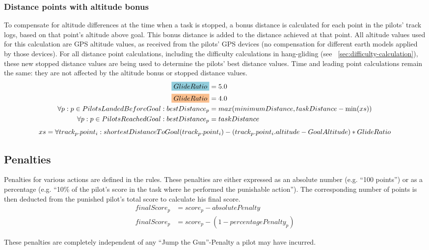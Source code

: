 \documentclass{article}
\begin{document}
\subsubsection{Distance points with altitude bonus}
\label{sec:distance-stopped-tasks}
To compensate for altitude differences at the time when a task is stopped,
a bonus distance is calculated for each point in the pilots’ track logs, based
on that point’s altitude above goal. This bonus distance is added to the
distance achieved at that point. All altitude values used for this calculation
are GPS altitude values, as received from the pilots’ GPS devices (no
compensation for different earth models applied by those devices). For all
distance point calculations, including the difficulty calculations in
hang-gliding (see ~\ref{sec:difficulty-calculation}), these new stopped
distance values are being used to determine the pilots’ best distance values.
Time and leading point calculations remain the same: they are not affected by
the altitude bonus or stopped distance values.
\begin{align*}
    \hgh{GlideRatio} &= 5.0 \\
    \pgh{GlideRatio} &= 4.0 \\
    \forall p : p \in PilotsLandedBeforeGoal : bestDistance_p &= max(minimumDistance, taskDistance - \min(xs)) \\
    \forall p : p \in PilotsReachedGoal : bestDistance_p &= taskDistance
\end{align*}
\[ xs = \forall track_p . point_i : shortestDistanceToGoal(track_p . point_i) - (track_p . point_i . altitude - GoalAltitude) * GlideRatio \\ \]

\subsection{Penalties}
Penalties for various actions are defined in the rules. These penalties are
either expressed as an absolute number (e.g. “100 points”) or as a percentage
(e.g. “10\% of the pilot’s score in the task where he performed the punishable
action”). The corresponding number of points is then deducted from the punished
pilot’s total score to calculate his final score.
\begin{align*}
    finalScore_p &= score_p - absolutePenalty \\
    finalScore_p &= score_p - (1 - percentagePenalty_p)
\end{align*}

\begin{hg}
These penalties are completely independent of any “Jump the Gun”-Penalty
a pilot may have incurred.
\end{hg}
\end{document}
